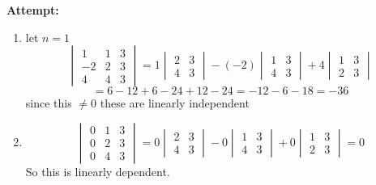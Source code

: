 \documentclass[12pt,letterpaper]{article}
\theoremstyle{definition}
\begin{document}
    
  \textbf{Attempt:}
    \begin{changemargin}{.5cm}{0cm}
    
    \begin{enumerate}[label=(\alph*)]
    \item let $n=1$
    \begin{equation*}
        \begin{vmatrix}
            1 & 1 & 3\\
            -2 & 2 & 3\\
            4 & 4 & 3
        \end{vmatrix}=
        1\begin{vmatrix}
            2 & 3\\
            4 & 3
        \end{vmatrix}
        -(-2)\begin{vmatrix}
            1 & 3\\
            4 & 3
        \end{vmatrix}
        +4\begin{vmatrix}
            1 & 3\\
            2 & 3
        \end{vmatrix}
    \end{equation*}
    \begin{equation*}
    = 6-12+ 6-24 + 12-24 = -12-6-18 = -36
   \end{equation*}
   since this $\neq 0$ these are linearly independent
    \item 
    \begin{equation*}
        \begin{vmatrix}
            0 & 1 & 3\\
            0 & 2 & 3\\
            0 & 4 & 3
        \end{vmatrix}=
        0\begin{vmatrix}
            2 & 3\\
            4 & 3
        \end{vmatrix}
        -0\begin{vmatrix}
            1 & 3\\
            4 & 3
        \end{vmatrix}
        +0\begin{vmatrix}
            1 & 3\\
            2 & 3
        \end{vmatrix} = 0
    \end{equation*}
    So this is linearly dependent.

\end{enumerate}
\end{changemargin}
\end{document}
